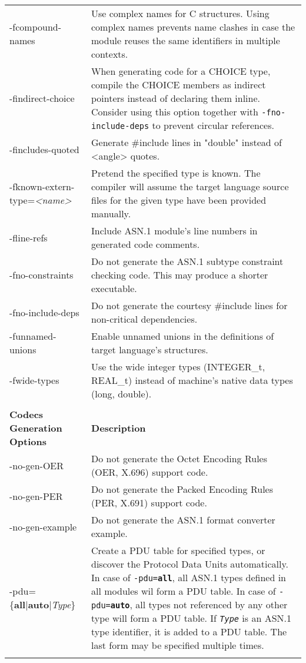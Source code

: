 \documentclass[english,oneside,12pt]{book}
\begin{document}
\begin{longtable}{lp{4in}}
{\ttfamily -fcompound-names} & {\small Use complex names for C structures. Using complex names prevents
name clashes in case the module reuses the same identifiers in multiple
contexts.}\\
{\ttfamily -findirect-choice} & {\small When generating code for a CHOICE type, compile the CHOICE
members as indirect pointers instead of declaring them inline. Consider
using this option together with \texttt{-fno-include-deps}
to prevent circular references.}\\
{\ttfamily -fincludes-quoted} & {\small Generate \#include lines in "double" instead of <angle> quotes.}\\
{\ttfamily -fknown-extern-type=\emph{<name>}} & {\small Pretend the specified type is known. The compiler will assume
the target language source files for the given type have been provided
manually. }\\
{\ttfamily -fline-refs} & {\small Include ASN.1 module's line numbers in generated code comments.}\\
{\ttfamily -fno-constraints} & {\small Do not generate the ASN.1 subtype constraint checking code. This
may produce a shorter executable.}\\
{\ttfamily -fno-include-deps} & {\small Do not generate the courtesy \#include lines for non-critical dependencies.}\\
{\ttfamily -funnamed-unions} & {\small Enable  unnamed  unions in the definitions of target language's structures.}\\
{\ttfamily -fwide-types} & {\small Use the wide integer types (INTEGER\_t, REAL\_t) instead of machine's native data types (long, double). }\\\\
\textbf{Codecs Generation Options} & \textbf{Description}\\
\midrule
{\ttfamily -no-gen-OER} & {\small Do not generate the Octet Encoding Rules (OER, X.696) support code.}\\
{\ttfamily -no-gen-PER} & {\small Do not generate the Packed Encoding Rules (PER, X.691) support code.}\\
{\ttfamily -no-gen-example} & {\small Do not generate the ASN.1 format converter example.}\\
{\ttfamily -pdu=\{\textbf{all}|\textbf{auto}|\emph{Type}\}} & {\small Create a PDU table for specified types, or discover the Protocol Data Units automatically.
In case of \texttt{-pdu=\textbf{all}}, all ASN.1 types defined in all modules wil form a PDU table. In case of \texttt{-pdu=\textbf{auto}}, all types not referenced by any other type will form a PDU table. If \texttt{\emph{Type}} is an ASN.1 type identifier, it is added to a PDU table. The last form may be specified multiple times.}\\ \\

\end{longtable}
\end{document}
